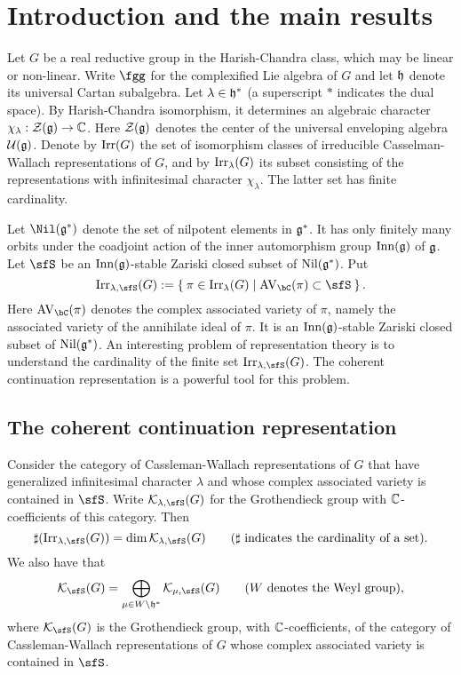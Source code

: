 \documentclass[counting_main.tex]{subfiles}
\begin{document}
\section{Introduction and the main results}

Let $G$ be a real reductive group in the Harish-Chandra class, which may be linear or non-linear. Write $\fgg$ for the complexified Lie algebra of $G$ and let $\mathfrak h$ denote its universal Cartan subalgebra. Let $\lambda \in \mathfrak h^*$ (a superscript $*$ indicates the dual space). By Harish-Chandra isomorphism, it determines  an algebraic character $\chi_\lambda: {\mathcal {Z}}(\mathfrak g)\rightarrow \mathbb{C}$. Here ${\mathcal {Z}}(\mathfrak g)$ denotes the center of the universal enveloping algebra $\mathcal U(\mathfrak g)$. Denote by $\mathrm{Irr}(G)$ the set of isomorphism classes of irreducible Casselman-Wallach representations of $G$, and by $\mathrm{Irr}_\lambda(G)$ its subset consisting of the representations with infinitesimal character $\chi_\lambda$. The latter set has finite cardinality.


Let $\Nil(\g^*)$ denote the set of nilpotent elements in $\mathfrak g^*$. It has only finitely many orbits under the coadjoint action of the inner automorphism group $\mathrm{Inn}(\mathfrak g)$ of $\mathfrak g$. Let $\sfS$ be an  $\mathrm{Inn}(\mathfrak g)$-stable Zariski closed subset of $\mathrm{Nil}(\mathfrak g^*)$. Put
\[
  \Irr_{\lambda,\sfS}(G):=\Set{\pi \in \Irr_{\lambda}(G)| \text{$\AVC(\pi)\subset \sfS$} }.
\]
Here $\AVC(\pi)$ denotes the complex associated variety of $\pi$, namely the associated variety of the annihilate ideal of $\pi$. It is an  $\mathrm{Inn}(\mathfrak g)$-stable Zariski closed subset of $\mathrm{Nil}(\mathfrak g^*)$.
An interesting  problem of representation theory is to understand the cardinality of the finite set $\Irr_{\lambda,\sfS}(G)$.
The coherent continuation representation is a powerful tool for this problem.

\subsection{The coherent continuation representation}


Consider the category of Cassleman-Wallach representations of $G$ that have generalized infinitesimal character $\lambda$ and whose complex associated variety is contained in $\sfS$.
Write  $\CK_{\lambda,\sfS}(G)$ for the  Grothendieck group with $\mathbb{C}$-coefficients  of this category. Then
\[
  \sharp (\Irr_{\lambda,\sfS}(G))=\dim \CK_{\lambda,\sfS}(G)\qquad(\sharp\textrm{ indicates the cardinality of a set}).
\]
We also have that
\[
  \CK_\sfS(G)=\bigoplus_{\mu\in W\backslash  \h^*} \CK_{\mu,\sfS}(G)\qquad (W\textrm{ denotes the Weyl group}),
\]
where $\CK_{\sfS}(G)$ is  the Grothendieck group, with $\mathbb{C}$-coefficients,  of the category of Cassleman-Wallach representations of $G$ whose complex associated variety is contained in $\sfS$.
\end{document}
